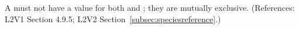 A \SpeciesReference must not have a value for both 
and ; they are mutually exclusive.  (References:
L2V1 Section 4.9.5; L2V2 Section~\ref{subsec:speciesreference}.)
